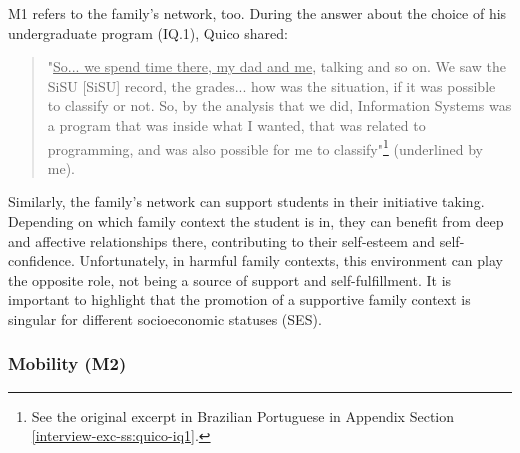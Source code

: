 \gls{M}1 refers to the family's network, too. During the answer about the choice of his undergraduate program (\gls{IQ}.1), Quico shared:
\begin{quote}
    "\underline{So... we spend time there, my dad and me}, talking and so on. We saw the \acrshort{SiSU} [\acrlong{SiSU}] record, the grades... how was the situation, if it was possible to classify or not. So, by the analysis that we did, Information Systems was a program that was inside what I wanted, that was related to programming, and was also possible for me to classify"\footnote{See the original excerpt in Brazilian Portuguese in Appendix Section \ref{interview-exc-ss:quico-iq1}.} (underlined by me).
\end{quote}
Similarly, the family's network can support students in their initiative taking. Depending on which family context the student is in, they can benefit from deep and affective relationships there, contributing to their self-esteem and self-confidence. Unfortunately, in harmful family contexts, this environment can play the opposite role, not being a source of support and self-fulfillment. It is important to highlight that the promotion of a supportive family context is singular for different  socioeconomic statuses (\acrshort{SES}).

\subsubsection{Mobility (M2)}

